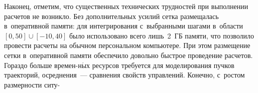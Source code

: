 \begin{multicols}{2}
     Наконец, отметим, что существенных техниче\-ских трудностей при 
выполнении расчетов не возникло. Без дополнительных усилий сетка 
размещалась в~оперативной памяти: для интегрирования\linebreak
 с~выбранными 
шагами в~об\-ласти $[0,50]\cup [-10,40]$ было использовано всего лишь~2~ГБ 
памяти, что позволило провести расчеты на обычном персональном 
компьютере. При этом размещение сетки в~оперативной памяти обеспечило 
довольно быст\-рое проведение расчетов. Гораздо больше времен-\linebreak н$\acute{\mbox{ы}}$х ресурсов 
требуется для моделирования пучков траекторий, осред\-не\-ния~--- срав\-не\-ния 
свойств управ\-ле\-ний. Конечно, с~рос\-том размерности ситу-\linebreak\vspace*{-12pt}

\pagebreak

\end{multicols}

\begin{figure*} %
\vspace*{1pt}
 \begin{center}  
  \mbox{%
 \epsfxsize=162.963mm 
 }
\end{center}
\vspace*{-11pt}
\vspace*{6pt}
 \begin{center}  
  \mbox{%
 \epsfxsize=163mm 
 }
\end{center}
\vspace*{-11pt}
\vspace*{6pt}
 \begin{center}  
  \mbox{%
 \epsfxsize=162.528mm 
 }
\end{center}
\vspace*{-11pt}
\end{figure*}

